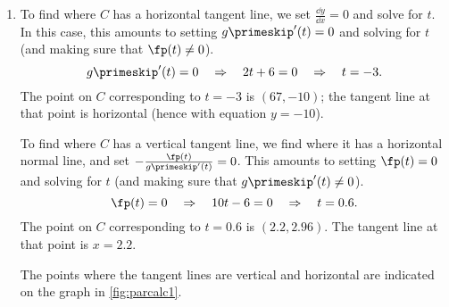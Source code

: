 \begin{example}
\begin{enumerate}
	\item	To find where $C$ has a horizontal tangent line, we set $\frac{\dd y}{\dd x}=0$ and solve for $t$. In this case, this amounts to setting $g\primeskip'(t)=0$ and solving for $t$ (and making sure that $\fp(t)\neq 0$). 
\[g\primeskip'(t)=0 \quad \Rightarrow \quad 2t+6=0 \quad \Rightarrow \quad t=-3.\]
	The point on $C$ corresponding to $t=-3$ is $(67,-10)$; the tangent line at that point is horizontal (hence with equation $y=-10$).
		
	To find where $C$ has a vertical tangent line, we find where it has a horizontal normal line, and set $-\frac{\fp(t)}{g\primeskip'(t)}=0$. This amounts to setting $\fp(t)=0$ and solving for $t$ (and making sure that $g\primeskip'(t)\neq 0$). 
	\[\fp(t)=0 \quad \Rightarrow \quad 10t-6=0 \quad \Rightarrow \quad t=0.6.\]
	The point on $C$ corresponding to $t=0.6$ is $(2.2,2.96)$. The tangent line at that point is $x=2.2$.
	
	The points where the tangent lines are vertical and horizontal are indicated on the graph in \autoref{fig:parcalc1}.
\end{enumerate}
\end{example}

